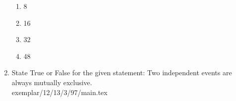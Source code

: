 \begin{enumerate}[label=\thesubsection.\arabic*,ref=\thesubsection.\theenumi,resume*]
\begin{table}[htb]
\caption{}
\label{tab:exemplar/12/13/3/87}
\end{table}
\begin{enumerate}
\item 8
\item 16
\item 32
\item 48
\end{enumerate}
\solution

\item State True or False for the given statement:
Two independent events are always mutually exclusive.\\
\solution 
 {exemplar/12/13/3/97/main.tex}
\end{enumerate}
